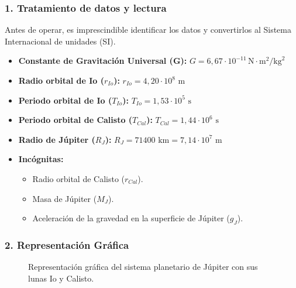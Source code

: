 \subsubsection*{1. Tratamiento de datos y lectura}
Antes de operar, es imprescindible identificar los datos y convertirlos al Sistema Internacional de unidades (SI).
\begin{itemize}
    \item \textbf{Constante de Gravitación Universal (G):} $G = 6,67 \cdot 10^{-11} \, \text{N}\cdot\text{m}^2/\text{kg}^2$
    \item \textbf{Radio orbital de Io ($r_{Io}$):} $r_{Io} = 4,20 \cdot 10^{8} \text{ m}$
    \item \textbf{Periodo orbital de Io ($T_{Io}$):} $T_{Io} = 1,53 \cdot 10^{5} \text{ s}$
    \item \textbf{Periodo orbital de Calisto ($T_{Cal}$):} $T_{Cal} = 1,44 \cdot 10^{6} \text{ s}$
    \item \textbf{Radio de Júpiter ($R_J$):} $R_J = 71400 \text{ km} = 7,14 \cdot 10^{7} \text{ m}$
    \item \textbf{Incógnitas:}
    \begin{itemize}
        \item Radio orbital de Calisto ($r_{Cal}$).
        \item Masa de Júpiter ($M_J$).
        \item Aceleración de la gravedad en la superficie de Júpiter ($g_J$).
    \end{itemize}
\end{itemize}

\subsubsection*{2. Representación Gráfica}
\begin{figure}[H]
    \centering
    \caption{Representación gráfica del sistema planetario de Júpiter con sus lunas Io y Calisto.}
\end{figure}

